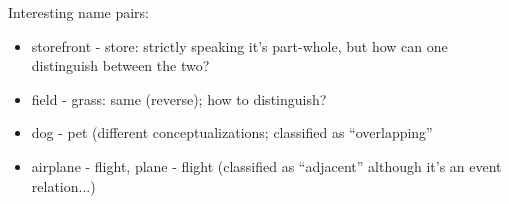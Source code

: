 Interesting name pairs:

\begin{itemize}
\item storefront - store: strictly speaking it's part-whole, but how can one distinguish between the two? 
\item field - grass: same (reverse); how to distinguish?
\item dog - pet (different conceptualizations; classified as ``overlapping''
\item airplane - flight, plane - flight (classified as ``adjacent'' although it's an event relation...)
\end{itemize}







